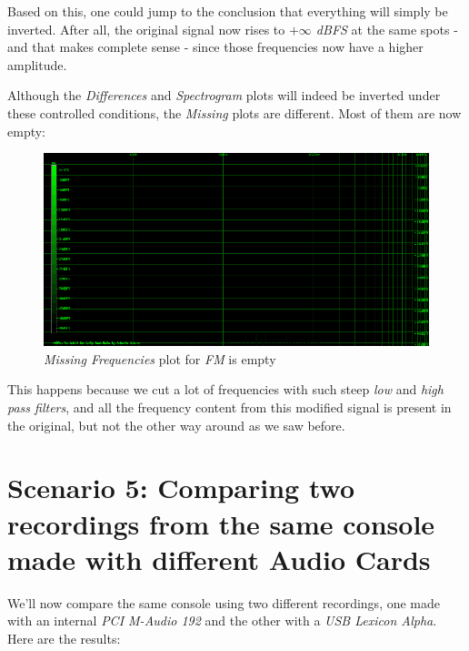 \documentclass[10pt,a4paper]{report}
\begin{document}
Based on this, one could jump to the conclusion that everything will simply be inverted. After all, the original signal now rises to \textit{$+\infty$ dBFS} at the same spots - and that makes complete sense -  since those frequencies now have a higher amplitude. 

Although the \textit{Differences} and \textit{Spectrogram} plots will indeed be inverted under these controlled conditions, the \textit{Missing} plots are different. Most of them are now empty:

\begin{figure}[H]
	\centering
	\includegraphics[width=1.0\linewidth]{images/interpretation/Plot4-8-Missing-FM-Inverted.png}
	\caption[Reversed FM Missing]{\textit{Missing Frequencies} plot for \textit{FM} is empty}
	\label{fig:plot4-8-missing-fm-inverted}
\end{figure}

This happens because we cut a lot of frequencies with such steep \textit{low} and \textit{high pass filters}, and all the frequency content from this modified signal is present in the original, but not the other way around as we saw before.

\section{Scenario 5: Comparing two recordings from the same console made with different Audio Cards}

We'll now compare the same console using two different recordings, one made with an internal \textit{PCI M-Audio 192} and the other with a \textit{USB Lexicon Alpha}. Here are the results:
\end{document}
